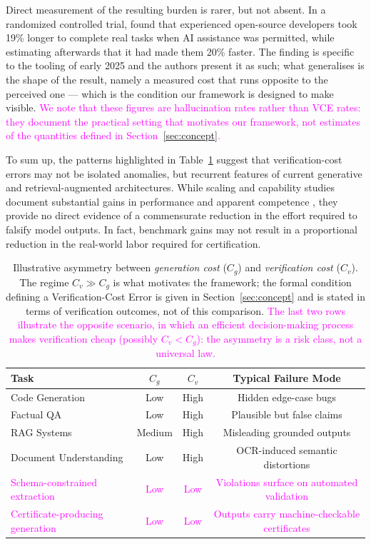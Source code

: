 \documentclass[11pt]{article}
\newcommand{\rev}[1]{\textcolor{magenta}{#1}}
\newcommand{\cfix}[1]{\textcolor{green!50!black}{#1}}
\newcommand{\viola}[1]{\textcolor[HTML]{7030A0}{#1}}
\newcommand{\rev}[1]{#1}
\newcommand{\cfix}[1]{#1}
\newcommand{\viola}[1]{#1}
\begin{document}
\viola{Direct measurement of the resulting burden is rarer, but not absent. In a randomized controlled trial, \citet{becker2025metr} found that experienced open-source developers took 19\% longer to complete real tasks when AI assistance was permitted, while estimating afterwards that it had made them 20\% faster. The finding is specific to the tooling of early 2025 and the authors present it as such; what generalises is the shape of the result, namely a measured cost that runs opposite to the perceived one --- which is the condition our framework is designed to make visible.}
\rev{We note that these figures are hallucination rates rather than VCE rates: they document the practical setting that motivates our framework, not estimates of the quantities defined in Section~\ref{sec:concept}.}

{To sum up, the patterns highlighted}
{in Table~\ref{tab:vbi_asymmetry} suggest that verification-cost errors \viola{may not be isolated anomalies, but recurrent features of current generative and retrieval-augmented architectures}. \cfix{While scaling and capability studies document substantial gains in performance and apparent competence \citep{wei2022emergent, bubeck2023sparks}, they provide no direct evidence of a commensurate reduction in the effort required to falsify model outputs.}
In fact, benchmark gains may not result in a proportional reduction in the real-world labor required for certification.}
\begin{table}[t]
\centering
\small
\begin{tabular}{lccc}
\toprule
\textbf{Task} & $C_g$& $C_v$& \textbf{Typical Failure Mode}\\
\midrule
Code Generation & Low & High & Hidden edge-case bugs\\
Factual QA & Low & High & Plausible but false claims\\
RAG Systems & Medium & High & Misleading grounded outputs\\
Document Understanding & Low & High & OCR-induced semantic distortions\\
\rev{Schema-constrained extraction} & \rev{Low} & \rev{Low} & \rev{Violations surface on automated validation}\\
\rev{Certificate-producing generation} & \rev{Low} & \rev{Low} & \rev{Outputs carry machine-checkable certificates}\\
\bottomrule
\end{tabular}
\caption{Illustrative asymmetry between \textit{generation cost} ($C_g$) and \textit{verification cost} ($C_v$). \viola{The regime $C_v \gg C_g$ is what motivates the framework; the formal condition defining a Verification-Cost Error is given in Section~\ref{sec:concept} and is stated in terms of verification outcomes, not of this comparison.} \rev{The last two rows illustrate the opposite scenario, in which an efficient decision-making process makes verification cheap (possibly $C_v < C_g$): the asymmetry is a risk class, not a universal law.}}
\label{tab:vbi_asymmetry}
\end{table}
\end{document}
